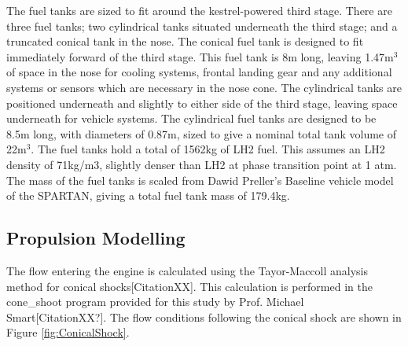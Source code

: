 		The fuel tanks are sized to fit around the kestrel-powered third stage. There are three fuel tanks; two cylindrical tanks situated underneath the third stage; and a truncated conical tank in the nose. The conical fuel tank is designed to fit immediately forward of the third stage. This fuel tank is 8m long, leaving 1.47m$^3$ of space in the nose for cooling systems, frontal landing gear and any additional systems or sensors which are necessary in the nose cone. The cylindrical tanks are positioned underneath and slightly to either side of the third stage, leaving space underneath for vehicle systems. The cylindrical fuel tanks are designed to be 8.5m long, with diameters of 0.87m, sized to give a nominal total tank volume of 22m$^3$.
The fuel tanks hold a total of 1562kg of LH2 fuel. This assumes an LH2 density of 71kg/m3, slightly denser than LH2 at phase transition point at 1 atm.
The mass of the fuel tanks is scaled from Dawid Preller's Baseline vehicle model of the SPARTAN, giving a total fuel tank mass of 179.4kg.
		

\subsection{Propulsion Modelling}

The flow entering the engine is calculated using the Tayor-Maccoll analysis method for conical shocks[CitationXX]. This calculation is performed in the cone\_shoot program provided for this study by Prof. Michael Smart[CitationXX?]. The flow conditions following the conical shock are shown in Figure \ref{fig:ConicalShock}. 

